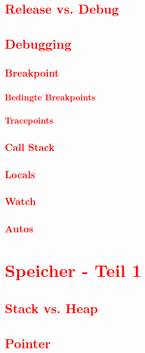 \section{\textcolor{red}{Release vs. Debug}}\label{sec:release-vs-debug}
\section{\textcolor{red}{Debugging}}\label{sec:debugging}
\subsection{\textcolor{red}{Breakpoint}}\label{sec:breakpoint}
\subsubsection{\textcolor{red}{Bedingte Breakpoints}}\label{sec:conditional-breakpoint}
\subsubsection{\textcolor{red}{Tracepoints}}\label{sec:tracepoint}
\subsection{\textcolor{red}{Call Stack}}\label{sec:call-stack}
\subsection{\textcolor{red}{Locals}}\label{sec:locals}
\subsection{\textcolor{red}{Watch}}\label{sec:watch}
\subsection{\textcolor{red}{Autos}}\label{sec:autos}

\chapter{\textcolor{red}{Speicher - Teil 1}}\label{chap:memory-1}
\section{\textcolor{red}{Stack vs. Heap}}\label{sec:stack-vs-heap}
\section{\textcolor{red}{Pointer}}\label{sec:pointers}
